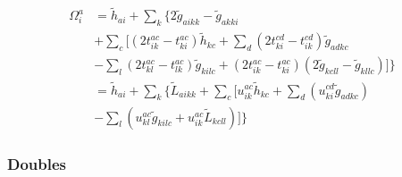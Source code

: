 \begin{equation}
  \begin{split}
    \Omega_i^a&={\tilde h}_{ai}+\sum_k\{2{\tilde g}_{aikk}-{\tilde g}_{akki}\\
    &+\sum_c[(2t_{ik}^{ac}-t_{ki}^{ac}){\tilde h}_{kc}+\sum_d(2t_{ki}^{cd}-t_{ik}^{cd}){\tilde g}_{adkc}\\
    &-\sum_l(2t_{kl}^{ac}-t_{lk}^{ac}){\tilde g}_{kilc}+(2t_{ik}^{ac}-t_{ki}^{ac})(2{\tilde g}_{kcll}-{\tilde g}_{kllc})]\}\\
    &={\tilde h}_{ai}+\sum_{k}\{{\tilde L}_{aikk}+\sum_c[u_{ik}^{ac}{\tilde h}_{kc}+\sum_d(u_{ki}^{cd}{\tilde g}_{adkc})\\
      &-\sum_l(u_{kl}^{ac}{\tilde g}_{kilc}+u_{ik}^{ac}{\tilde L}_{kcll})]\}
   \end{split}
\end{equation}

\subsubsection{Doubles}
\hypertarget{sec:ccsd_res_doub}{}
\label{sec:ccsd_res_doub}

